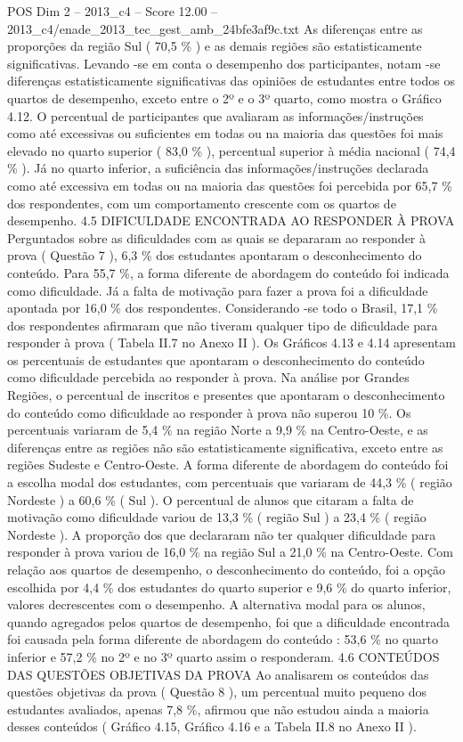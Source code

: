 \begin{textsample}{POS Dim 2 – 2013\_c4 – Score 12.00 – 2013\_c4/enade\_2013\_tec\_gest\_amb\_24bfe3af9c.txt}
As diferenças entre as proporções da região Sul ( 70,5 \% ) e as demais regiões são estatisticamente significativas.
Levando -se em conta o desempenho dos participantes, notam -se diferenças estatisticamente significativas das opiniões de estudantes entre todos os quartos de desempenho, exceto entre o 2º e o 3º quarto, como mostra o Gráfico 4.12.
O percentual de participantes que avaliaram as informações/instruções como até excessivas ou suficientes em todas ou na maioria das questões foi mais elevado no quarto superior ( 83,0 \% ), percentual superior à média nacional ( 74,4 \% ).
Já no quarto inferior, a suficiência das informações/instruções declarada como até excessiva em todas ou na maioria das questões foi percebida por 65,7 \% dos respondentes, com um comportamento crescente com os quartos de desempenho. 4.5 DIFICULDADE ENCONTRADA AO RESPONDER À PROVA Perguntados sobre as dificuldades com as quais se depararam ao responder à prova ( Questão 7 ), 6,3 \% dos estudantes apontaram o desconhecimento do conteúdo.
Para 55,7 \%, a forma diferente de abordagem do conteúdo foi indicada como dificuldade.
Já a falta de motivação para fazer a prova foi a dificuldade apontada por 16,0 \% dos respondentes.
Considerando -se todo o Brasil, 17,1 \% dos respondentes afirmaram que não tiveram qualquer tipo de dificuldade para responder à prova ( Tabela II.7 no Anexo II ).
Os Gráficos 4.13 e 4.14 apresentam os percentuais de estudantes que apontaram o desconhecimento do conteúdo como dificuldade percebida ao responder à prova.
Na análise por Grandes Regiões, o percentual de inscritos e presentes que apontaram o desconhecimento do conteúdo como dificuldade ao responder à prova não superou 10 \%.
Os percentuais variaram de 5,4 \% na região Norte a 9,9 \% na Centro-Oeste, e as diferenças entre as regiões não são estatisticamente significativa, exceto entre as regiões Sudeste e Centro-Oeste.
A forma diferente de abordagem do conteúdo foi a escolha modal dos estudantes, com percentuais que variaram de 44,3 \% ( região Nordeste ) a 60,6 \% ( Sul ).
O percentual de alunos que citaram a falta de motivação como dificuldade variou de 13,3 \% ( região Sul ) a 23,4 \% ( região Nordeste ).
A proporção dos que declararam não ter qualquer dificuldade para responder à prova variou de 16,0 \% na região Sul a 21,0 \% na Centro-Oeste.
Com relação aos quartos de desempenho, o desconhecimento do conteúdo, foi a opção escolhida por 4,4 \% dos estudantes do quarto superior e 9,6 \% do quarto inferior, valores decrescentes com o desempenho.
A alternativa modal para os alunos, quando agregados pelos quartos de desempenho, foi que a dificuldade encontrada foi causada pela forma diferente de abordagem do conteúdo : 53,6 \% no quarto inferior e 57,2 \% no 2º e no 3º quarto assim o responderam. 4.6 CONTEÚDOS DAS QUESTÕES OBJETIVAS DA PROVA Ao analisarem os conteúdos das questões objetivas da prova ( Questão 8 ), um percentual muito pequeno dos estudantes avaliados, apenas 7,8 \%, afirmou que não estudou ainda a maioria desses conteúdos ( Gráfico 4.15, Gráfico 4.16 e a Tabela II.8 no Anexo II ).

\end{textsample}
